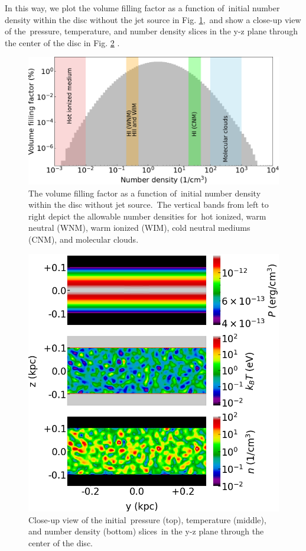 \documentclass[fleqn,usenatbib,useAMS]{mnras}
\begin{document}
  In this way, we plot the volume filling factor as a function of\
  initial number density within the disc without the jet source in Fig. \ref{fig__numberDensityHistogram},\
  and show a close-up view of the\
  pressure, temperature, and number density slices
  in the y-z plane through the center of the disc in Fig. \ref{fig__zoom-in-disc} .

  \begin{figure}
      \includegraphics[width=\columnwidth]{figures/fig__numberDensityHistogram.png}
    \caption{The volume filling factor as a function of\
             initial number density within the disc without jet source.\
             The vertical bands from left to right depict the allowable number densities \citep{peak-ism-density} for\
             hot ionized, warm neutral (WNM), warm ionized (WIM), cold neutral mediums (CNM), and molecular clouds.}
      \label{fig__numberDensityHistogram}
  \end{figure}

  \begin{figure}
    \includegraphics[width=\columnwidth]{figures/fig__zoom-in-disc.png}
    \caption{Close-up view of the initial\
             pressure (top), temperature (middle), and number density (bottom) slices\
             in the y-z plane through the center of the disc.
             }
    \label{fig__zoom-in-disc}
  \end{figure}
\end{document}
